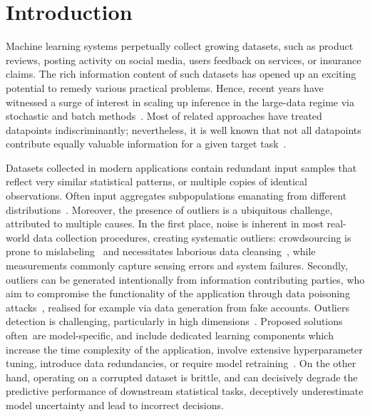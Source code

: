 \section{Introduction}
\label{sec:introduction}

Machine learning systems perpetually collect growing datasets, such as product reviews, posting activity on social media, users feedback on services, or insurance claims. The rich information content of such datasets has opened up an exciting potential to remedy various practical problems. Hence, recent years have witnessed a surge of interest in scaling up inference in the large-data regime via stochastic and batch methods~\cite{angelino16, hoffman13, welling11}. Most of related approaches have treated datapoints indiscriminantly; nevertheless, it is well known that not all datapoints contribute equally valuable information for a given target task~\cite{ghorbani19}. 

Datasets collected in modern applications contain redundant input samples that reflect very similar statistical patterns, or multiple copies of identical observations. Often input aggregates subpopulations emanating from different distributions~\cite{zheng08, zhuang15}. Moreover, the presence of outliers is a ubiquitous challenge, attributed to multiple causes. In the first place, noise is inherent in most real-world data collection procedures, creating systematic outliers: crowdsourcing is prone to mislabeling~\cite{frenay13} and necessitates laborious data cleansing~\cite{lewis04, paschou10}, while measurements commonly capture sensing errors and system failures. Secondly, outliers can be generated intentionally from information contributing parties, who aim to compromise the functionality of the application through data poisoning attacks~\cite{barreno10, biggio12, li16, koh17, steinhardt17, ghorbani19}, realised for example via data generation from fake accounts. Outliers detection is  challenging, particularly in high dimensions~\cite{lucic16outliers, diakonikolas19, dickens20}. Proposed solutions \mbox{often are} model-specific, and include dedicated learning components which increase the time complexity of the application, involve extensive hyperparameter tuning, introduce data redundancies, or require model retraining~\cite{sheng08, whitehill09, raykar10, karger11, liu12, zhang16}. On the other hand, operating on a corrupted dataset is brittle, and can decisively degrade the predictive performance of downstream statistical tasks, deceptively underestimate model uncertainty and lead to incorrect decisions. 

